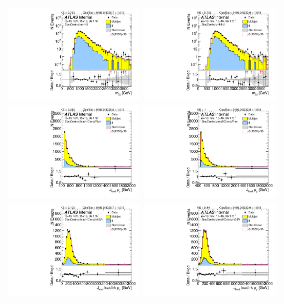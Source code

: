 \begin{figure}[htbp!]
\begin{center}
\includegraphics[angle=270, width=0.31\textwidth]{./figures/boosted/Prereweight/Moriond_TwoTag_split_Control_mHH_l_1.pdf}
\includegraphics[angle=270, width=0.31\textwidth]{./figures/boosted/Control/b77_TwoTag_split_Control_mHH_l_1.pdf}\\
\includegraphics[angle=270, width=0.31\textwidth]{./figures/boosted/Prereweight/Moriond_TwoTag_split_Control_leadHCand_Pt_m.pdf}
\includegraphics[angle=270, width=0.31\textwidth]{./figures/boosted/Control/b77_TwoTag_split_Control_leadHCand_Pt_m.pdf}\\
\includegraphics[angle=270, width=0.31\textwidth]{./figures/boosted/Prereweight/Moriond_TwoTag_split_Control_leadHCand_trk0_Pt.pdf}
\includegraphics[angle=270, width=0.31\textwidth]{./figures/boosted/Control/b77_TwoTag_split_Control_leadHCand_trk0_Pt.pdf}\\

\end{center}
\end{figure}
